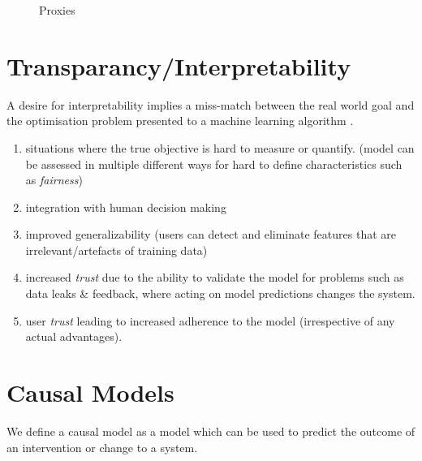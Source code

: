 \documentclass[a3,portrait,14pt]{sciposter}
\begin{document}
\begin{multicols}{2}
\begin{figure}[H]
\caption{Proxies}
\label{fig:recidivism}
	\centering    
\end{figure}

\section*{Transparancy/Interpretability}
A desire for interpretability implies a miss-match between the real world goal and the optimisation problem presented to a machine learning algorithm \cite{Lipton2016}.
\begin{enumerate}
\item situations where the true objective is hard to measure or quantify. (model can be assessed in multiple different ways for hard to define characteristics such as \textit{fairness}) 
\item integration with human decision making
\item improved generalizability (users can detect and eliminate features that are irrelevant/artefacts of training data)
\item increased \textit{trust} due to the ability to validate the model for problems such as data leaks \& feedback, where acting on model predictions changes the system. 
\item user \textit{trust} leading to increased adherence to the model (irrespective of any actual advantages). 
\end{enumerate}


\section*{Causal Models}
We define a causal model as a model which can be used to predict the outcome of an intervention or change to a system. 


\end{multicols}
\end{document}
